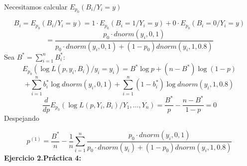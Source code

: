 Necesitamos calcular $E_{p_0}(B_i/Y_i=y)$

\[
B_i=E_{p_0}(B_i/Y_i=y)=1\cdot E_{p_0}(B_i=1/Y_i=y)+0 \cdot E_{p_0}(B_i=0/Y_i=y)
\]
\[
=\frac{p_0 \cdot dnorm(y_i,0,1)}{p_0 \cdot dnorm(y_i,0,1)+(1-p_0)dnorm(y_i,1,0.8)}
\]
Sea $B^*=\sum_{i=1}^{n} B_i^*$:
\[
E_{p_0}(\log L(p,y_i,B_i)/y_i=y_i)=B^* \log p + (n-B^*) \log (1-p) 
\]\[+ \sum_{i=1}^{n} b_i^* \log dnorm(y_i,0,1)
+\sum_{i=1}^{n}(1-b_i^*) \log dnorm(y_i,1,0.8)
\]
\[
\frac{d}{dp} E_{p_0} (\log L(p,Y_i,B_i)/Y_1,\dots,Y_n)=\frac{B^*}{p}-\frac{n-B^*}{1-p}=0
\]
Despejando

\[
p^{(1)}=\frac{B^*}{n}-\frac{1}{n} \sum_{i=1}^{n} \frac{p_0 \cdot dnorm(y_i,0,1)}{p_0 \cdot dnorm(y_i)+(1-p_0)dnorm(y_i,1,0.8)}
\]
\newpage
\textbf{Ejercicio 2.Práctica 4:}


